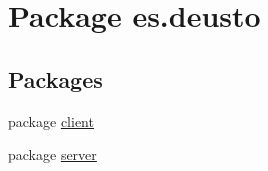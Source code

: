 \hypertarget{namespacees_1_1deusto}{}\section{Package es.\+deusto}
\label{namespacees_1_1deusto}
\subsection*{Packages}
\begin{DoxyCompactItemize}
\item 
package \hyperlink{namespacees_1_1deusto_1_1client}{client}
\item 
package \hyperlink{namespacees_1_1deusto_1_1server}{server}
\end{DoxyCompactItemize}
